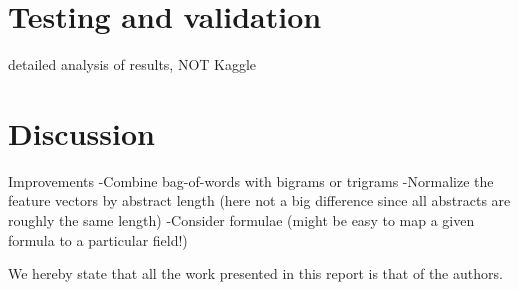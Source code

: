 \documentclass{acm_proc_article-sp}
\begin{document}
\section{Testing and validation}
detailed analysis of results, NOT Kaggle

\section{Discussion}
Improvements
-Combine bag-of-words with bigrams or trigrams
-Normalize the feature vectors by abstract length (here not a big difference since all abstracts are roughly the same length)
-Consider formulae (might be easy to map a given formula to a particular field!)


We hereby state that all the work presented in this report is that of the authors.

%


%
%
\end{document}
